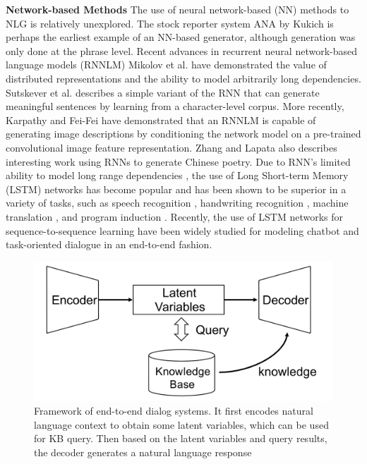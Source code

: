 \documentclass[10pt,twocolumn,letterpaper]{article}
\begin{document}
\textbf{Network-based Methods} The use of neural network-based (NN) methods to NLG is relatively unexplored. The stock reporter system ANA by Kukich \cite{kukich1987phrases} is perhaps the earliest example of an NN-based generator, although generation was only done at the phrase level. Recent advances in recurrent neural network-based language models (RNNLM) Mikolov et al. \cite{mikolov2010recurrent,mikolov2011extensions} have demonstrated the value of distributed representations and the ability to model arbitrarily long dependencies. Sutskever et al.\cite{sutskever2011generating} describes a simple variant of the RNN that can generate meaningful sentences by learning from a character-level corpus. More recently, Karpathy and Fei-Fei \cite{karpathy2015deep} have demonstrated that an RNNLM is capable of generating image descriptions by conditioning the network model on a pre-trained convolutional image feature representation. Zhang and Lapata\cite{zhang2014chinese} also describes interesting work using RNNs to generate Chinese poetry. Due to RNN’s limited ability to model long range dependencies \cite{bengio1994learning}, the use of Long Short-term Memory (LSTM) networks \cite{hochreiter1997long} has become popular and has been shown to be superior in a variety of tasks, such as speech recognition \cite{graves2013speech}, handwriting recognition \cite{graves2008novel}, machine translation \cite{cho2014learning,sutskever2014sequence}, and program induction \cite{graves2014neural}. Recently, the use of LSTM networks for sequence-to-sequence learning \cite{sutskever2014sequence} have been widely studied for modeling chatbot  \cite{vinyals2015neural,shang2015neural} and task-oriented dialogue \cite{wen2016conditional,wen2016multi} in an end-to-end fashion.
\begin{figure}
    \centering
    \includegraphics[scale = 0.35]{end2endframework.png}
    \caption{Framework of end-to-end dialog systems. It first encodes natural language context to obtain some latent variables, which can be used for KB query. Then based on the latent variables and query results, the decoder generates a natural language response}
    \label{end2endframework}
\end{figure}
\end{document}
